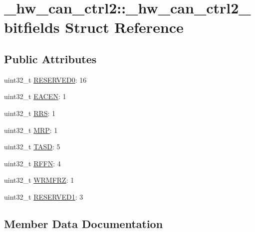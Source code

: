 \hypertarget{struct__hw__can__ctrl2_1_1__hw__can__ctrl2__bitfields}{}\section{\+\_\+hw\+\_\+can\+\_\+ctrl2\+:\+:\+\_\+hw\+\_\+can\+\_\+ctrl2\+\_\+bitfields Struct Reference}
\label{struct__hw__can__ctrl2_1_1__hw__can__ctrl2__bitfields}
\subsection*{Public Attributes}
\begin{DoxyCompactItemize}
\item 
uint32\+\_\+t \hyperlink{struct__hw__can__ctrl2_1_1__hw__can__ctrl2__bitfields_a69d5ee6eef1852634e07131c19af9981}{R\+E\+S\+E\+R\+V\+E\+D0}\+: 16
\item 
uint32\+\_\+t \hyperlink{struct__hw__can__ctrl2_1_1__hw__can__ctrl2__bitfields_a14df1f794a170f691ad2a632a69f0b2b}{E\+A\+C\+EN}\+: 1
\item 
uint32\+\_\+t \hyperlink{struct__hw__can__ctrl2_1_1__hw__can__ctrl2__bitfields_abdff7fad0c0ac144a42f0373245a6f1a}{R\+RS}\+: 1
\item 
uint32\+\_\+t \hyperlink{struct__hw__can__ctrl2_1_1__hw__can__ctrl2__bitfields_adecb4fe09881284c82131b2dea3c6f4d}{M\+RP}\+: 1
\item 
uint32\+\_\+t \hyperlink{struct__hw__can__ctrl2_1_1__hw__can__ctrl2__bitfields_a6f1fcd1cf1a9c9b6d2e520b642e832b3}{T\+A\+SD}\+: 5
\item 
uint32\+\_\+t \hyperlink{struct__hw__can__ctrl2_1_1__hw__can__ctrl2__bitfields_aace80b567a6be1b0a96ddf89e0dbf503}{R\+F\+FN}\+: 4
\item 
uint32\+\_\+t \hyperlink{struct__hw__can__ctrl2_1_1__hw__can__ctrl2__bitfields_af07bdaf9c52dad5f9d1401e046cf6adb}{W\+R\+M\+F\+RZ}\+: 1
\item 
uint32\+\_\+t \hyperlink{struct__hw__can__ctrl2_1_1__hw__can__ctrl2__bitfields_a2825eb4c03ffd0c27d08b2281483c79b}{R\+E\+S\+E\+R\+V\+E\+D1}\+: 3
\end{DoxyCompactItemize}


\subsection{Member Data Documentation}
